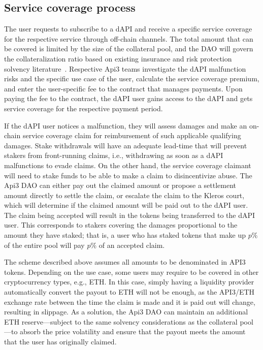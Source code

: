 \documentclass[11pt]{article}
\begin{document}
\subsection{Service coverage process}
\label{sec:service-coverage-process}

The user requests to subscribe to a dAPI and receive a specific service coverage for the respective service through off-chain channels.
The total amount that can be covered is limited by the size of the collateral pool, and the DAO will govern the collateralization ratio based on existing insurance and risk protection solvency literature~\cite{solvency}.
Respective Api3 teams investigate the dAPI malfunction risks and the specific use case of the user, calculate the service coverage premium, and enter the user-specific fee to the contract that manages payments.
Upon paying the fee to the contract, the dAPI user gains access to the dAPI and gets service coverage for the respective payment period.

If the dAPI user notices a malfunction, they will assess damages and make an on-chain service coverage claim for reimbursement of such applicable qualifying damages.
Stake withdrawals will have an adequate lead-time that will prevent stakers from front-running claims, i.e., withdrawing as soon as a dAPI malfunctions to evade claims.
On the other hand, the service coverage claimant will need to stake funds to be able to make a claim to disincentivize abuse.
The Api3 DAO can either pay out the claimed amount or propose a settlement amount directly to settle the claim, or escalate the claim to the Kleros court, which will determine if the claimed amount will be paid out to the dAPI user.
The claim being accepted will result in the tokens being transferred to the dAPI user.
This corresponds to stakers covering the damages proportional to the amount they have staked; that is, a user who has staked tokens that make up $p\%$ of the entire pool will pay $p\%$ of an accepted claim.

The scheme described above assumes all amounts to be denominated in API3 tokens.
Depending on the use case, some users may require to be covered in other cryptocurrency types, e.g., ETH.
In this case, simply having a liquidity provider automatically convert the payout to ETH will not be enough, as the API3/ETH exchange rate between the time the claim is made and it is paid out will change, resulting in slippage.
As a solution, the Api3 DAO can maintain an additional ETH reserve---subject to the same solvency considerations as the collateral pool---to absorb the price volatility and ensure that the payout meets the amount that the user has originally claimed.
\end{document}
